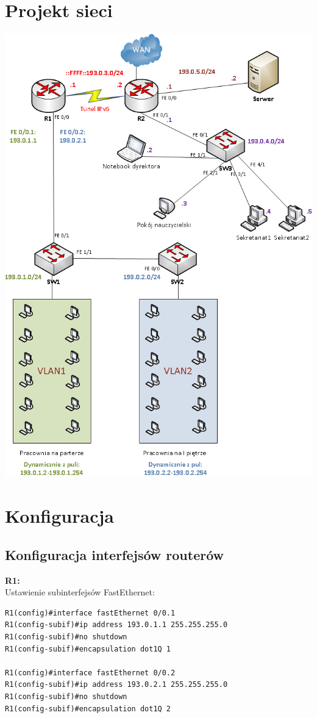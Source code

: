 \documentclass[11pt,a4paper]{article}
\begin{document}
\section{Projekt sieci}
\includegraphics[scale=0.6]{siec.png}  

\section{Konfiguracja}

\subsection{Konfiguracja interfejsów routerów}
{\bf R1:}\\
\noindent
Ustawienie subinterfejsów FastEthernet:
\begin{lstlisting}
R1(config)#interface fastEthernet 0/0.1
R1(config-subif)#ip address 193.0.1.1 255.255.255.0
R1(config-subif)#no shutdown
R1(config-subif)#encapsulation dot1Q 1

R1(config)#interface fastEthernet 0/0.2
R1(config-subif)#ip address 193.0.2.1 255.255.255.0
R1(config-subif)#no shutdown
R1(config-subif)#encapsulation dot1Q 2
\end{lstlisting}
\end{document}
